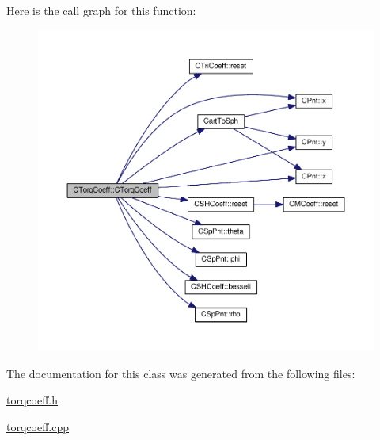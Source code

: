 Here is the call graph for this function\-:
\nopagebreak
\begin{figure}[H]
\begin{center}
\leavevmode
\includegraphics[width=350pt]{classCTorqCoeff_a4c2700efbae3670b13ed1bcea4d990a8_cgraph}
\end{center}
\end{figure}




The documentation for this class was generated from the following files\-:\begin{DoxyCompactItemize}
\item 
\hyperlink{torqcoeff_8h}{torqcoeff.\-h}\item 
\hyperlink{torqcoeff_8cpp}{torqcoeff.\-cpp}\end{DoxyCompactItemize}
